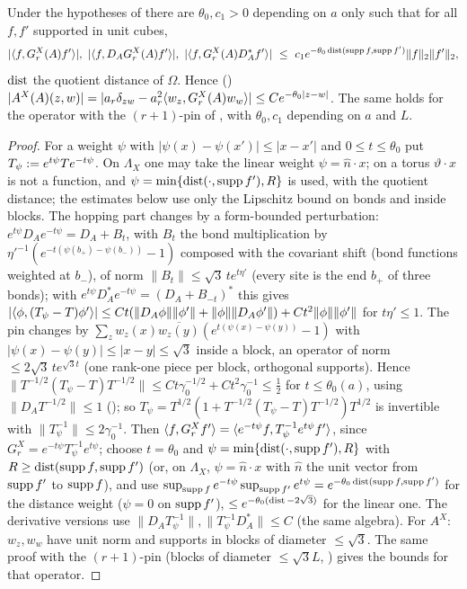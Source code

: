 \begin{proposition}\label{rot:hyb:prop:CT}
Under the hypotheses of  there are $\theta_0,c_1>0$ depending on $a$ only such that for all $f,f'$ supported in unit cubes,
\[
|\ip f{G^X_r(A)f'}|,\ |\ip f{D_AG^X_r(A)f'}|,\ |\ip f{G^X_r(A)D_A^*f'}|\ \le\ c_1e^{-\theta_0\dist(\supp f,\supp f')}\|f\|_2\|f'\|_2 ,
\]
$\operatorname{dist}$ the quotient distance of $\Omega$. Hence (\cite[(3.6)]{K1}) $|A^X(A)(z,w)|=|a_r\delta_{zw}-a_r^2\langle w_z,G^X_r(A)w_w\rangle|\le Ce^{-\theta_0|z-w|}$. The same holds for the operator with the $(r+1)$-pin of , with $\theta_0,c_1$ depending on $a$ and $L$.
\end{proposition}
\begin{proof}
For a weight $\psi$ with $|\psi(x)-\psi(x')|\le|x-x'|$ and $0\le t\le\theta_0$ put $T_\psi:= e^{t\psi}Te^{-t\psi}$. On $\Lambda_X$ one may take the linear weight $\psi=\hat n\cdot x$; on a torus $\vartheta\cdot x$ is not a function, and $\psi=\min\{\operatorname{dist}(\cdot,\operatorname{supp} f'),R\}$ is used, with the quotient distance; the estimates below use only the Lipschitz bound on bonds and inside blocks. The hopping part changes by a form-bounded perturbation: $e^{t\psi}D_Ae^{-t\psi}=D_A+B_t$, with $B_t$ the bond multiplication by $\eta'^{-1}(e^{-t(\psi(b_+)-\psi(b_-))}-1)$ composed with the covariant shift (bond functions weighted at $b_-$), of norm $\|B_t\|\le\sqrt3\,te^{t\eta'}$ (every site is the end $b_+$ of three bonds); with $e^{t\psi}D_A^*e^{-t\psi}=(D_A+B_{-t})^*$ this gives $|\langle \phi,(T_\psi-T)\phi'\rangle|\le Ct(\|D_A\phi\|\|\phi'\|+\|\phi\|\|D_A\phi'\|)+Ct^2\|\phi\|\|\phi'\|$ for $t\eta'\le1$. The pin changes by $\sum_zw_z(x)\overline{w_z(y)}(e^{t(\psi(x)-\psi(y))}-1)$ with $|\psi(x)-\psi(y)|\le|x-y|\le\sqrt3$ inside a block, an operator of norm $\le2\sqrt3\,te^{\sqrt3t}$ (one rank-one piece per block, orthogonal supports). Hence $\|T^{-1/2}(T_\psi-T)T^{-1/2}\|\le Ct\gamma_0^{-1/2}+Ct^2\gamma_0^{-1}\le\frac12$ for $t\le\theta_0(a)$, using $\|D_AT^{-1/2}\|\le1$ (); so $T_\psi=T^{1/2}(1+T^{-1/2}(T_\psi-T)T^{-1/2})T^{1/2}$ is invertible with $\|T_\psi^{-1}\|\le2\gamma_0^{-1}$. Then $\langle f,G^X_rf'\rangle=\langle e^{-t\psi}f,T_\psi^{-1}e^{t\psi}f'\rangle$, since $G^X_r=e^{-t\psi}T_\psi^{-1}e^{t\psi}$; choose $t=\theta_0$ and $\psi=\min\{\operatorname{dist}(\cdot,\operatorname{supp} f'),R\}$ with $R\ge\operatorname{dist}(\operatorname{supp} f,\operatorname{supp} f')$ (or, on $\Lambda_X$, $\psi=\hat n\cdot x$ with $\hat n$ the unit vector from $\operatorname{supp} f'$ to $\operatorname{supp} f$), and use $\sup_{\operatorname{supp} f}e^{-t\psi}\sup_{\operatorname{supp} f'}e^{t\psi}=e^{-\theta_0\operatorname{dist}(\operatorname{supp} f,\operatorname{supp} f')}$ for the distance weight ($\psi=0$ on $\operatorname{supp} f'$), $\le e^{-\theta_0(\operatorname{dist}-2\sqrt3)}$ for the linear one. The derivative versions use $\|D_AT_\psi^{-1}\|,\|T_\psi^{-1}D_A^*\|\le C$ (the same algebra). For $A^X$: $w_z,w_w$ have unit norm and supports in blocks of diameter $\le\sqrt3$. The same proof with the $(r+1)$-pin (blocks of diameter $\le\sqrt3L$, ) gives the bounds for that operator.
\end{proof}

